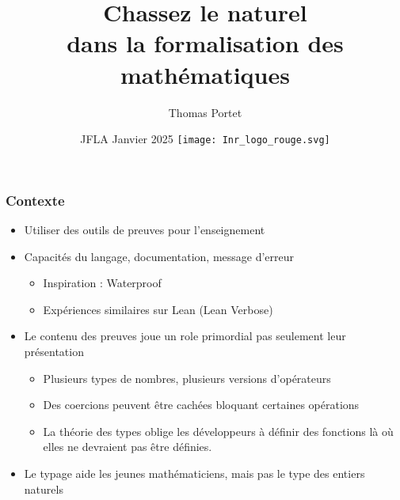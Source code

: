 \documentclass[compress]{beamer}
\title{Chassez le naturel\\ dans la formalisation des math\'ematiques\\
}
\author{Thomas Portet}
\date{JFLA Janvier 2025
\newline
\newline\newline
\newline
\texttt{[image: Inr\_logo\_rouge.svg]}\\[2cm] }
\begin{document}
%

\maketitle
\begin{frame}
\frametitle{Contexte}
\begin{itemize}
\item Utiliser des outils de preuves pour l'enseignement
\item Capacit\'es du langage, documentation, message d'erreur
\begin{itemize}
\item Inspiration : Waterproof
\item Exp\'eriences similaires sur Lean (Lean Verbose)
\end{itemize}
\item Le contenu des preuves joue un role primordial pas seulement leur pr\'esentation
\begin{itemize}
\item Plusieurs types de nombres, plusieurs versions d'op\'erateurs
\item Des coercions peuvent \^etre cach\'ees bloquant certaines op\'erations
\item La th\'eorie des types oblige les d\'eveloppeurs \`a d\'efinir des fonctions l\`a o\`u elles ne devraient pas \^etre d\'efinies.
\end{itemize}
\item Le typage aide les jeunes math\'ematiciens, mais pas le type des entiers naturels
\end{itemize}
\end{frame}
\end{document}
